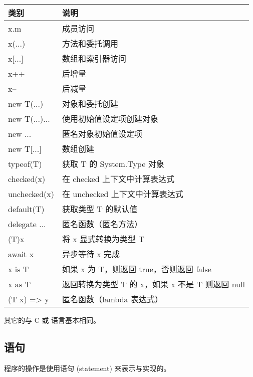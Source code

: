 \begin{tabular}{|l|l|}
\hline
类别            & 说明 \\
\hline
x.m            &          成员访问  \\
x(...)         &           方法和委托调用  \\
x[...]         &           数组和索引器访问  \\
x++            &        后增量  \\
x--            &           后减量  \\
new T(...)     &       对象和委托创建  \\
new T(...){...}&      使用初始值设定项创建对象  \\
new {...}      &         匿名对象初始值设定项  \\
new T[...]     &        数组创建  \\
typeof(T)      &      获取 T 的 System.Type 对象  \\
checked(x)     &    在 checked 上下文中计算表达式  \\
unchecked(x)   & 在 unchecked 上下文中计算表达式  \\
default(T)     &       获取类型 T 的默认值  \\
delegate {...} &      匿名函数（匿名方法）  \\
(T)x           &             将 x 显式转换为类型 T  \\
await x        &         异步等待 x 完成  \\
x is T         &            如果 x 为 T，则返回 true，否则返回 false  \\
x as T         &           返回转换为类型 T 的 x，如果 x 不是 T 则返回 null  \\
(T x) => y     &       匿名函数（lambda 表达式）  \\
\hline
\end{tabular}

其它的与 C 或 \cpp 语言基本相同。


\subsection{ 语句 }
程序的操作是使用语句 (statement) 来表示与实现的。

